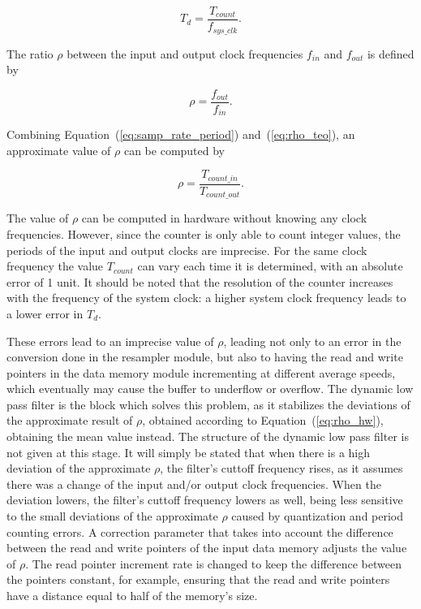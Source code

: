 \begin{equation}
  T_d = \frac{T_{count}}{f_{sys\_clk}}.
  \label{eq:samp_rate_period}
\end{equation}

The ratio $\rho$ between the input and output clock frequencies $f_{in}$ and $f_{out}$
is defined by

\begin{equation}
  \rho = \frac{f_{out}}{f_{in}}.
  \label{eq:rho_teo}
\end{equation}

Combining Equation~(\ref{eq:samp_rate_period}) and~(\ref{eq:rho_teo}), an
approximate value of $\rho$ can be computed by

\begin{equation}
  \rho  = \frac{T_{count\_in}}{T_{count\_out}}.
  \label{eq:rho_hw}
\end{equation}

The value of $\rho$ can be computed in hardware without knowing any clock
frequencies. However, since the counter is only able to count integer values,
the periods of the input and output clocks are imprecise.  For the same clock
frequency the value $T_{count}$ can vary each time it is determined, with an
absolute error of 1 unit. It should be noted that the resolution of the counter
increases with the frequency of the system clock: a higher system clock
frequency leads to a lower error in $T_d$.

These errors lead to an imprecise value of $\rho$, leading not only to an error
in the conversion done in the resampler module, but also to having the read and
write pointers in the data memory module incrementing at different average
speeds, which eventually may cause the buffer to underflow or overflow. The
dynamic low pass filter is the block which solves this problem, as it stabilizes
the deviations of the approximate result of $\rho$, obtained according to
Equation~(\ref{eq:rho_hw}), obtaining the mean value instead. The structure of
the dynamic low pass filter is not given at this stage. It will simply be stated
that when there is a high deviation of the approximate $\rho$, the filter's
cuttoff frequency rises, as it assumes there was a change of the input and/or
output clock frequencies. When the deviation lowers, the filter's cuttoff
frequency lowers as well, being less sensitive to the small deviations of the
approximate $\rho$ caused by quantization and period counting errors. A
correction parameter that takes into account the difference between the read and
write pointers of the input data memory adjusts the value of $\rho$. The read
pointer increment rate is changed to keep the difference between the pointers
constant, for example, ensuring that the read and write pointers have a distance
equal to half of the memory's size.


